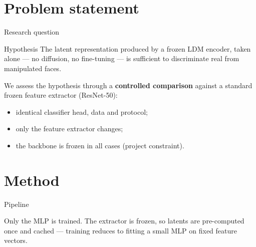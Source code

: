 \documentclass[aspectratio=169,11pt]{beamer}
\begin{document}
\section{Problem statement}

\begin{frame}{Research question}
  \begin{block}{Hypothesis}
    The latent representation produced by a \alert{frozen} LDM encoder,
    taken \alert{alone} --- no diffusion, no fine-tuning --- is sufficient
    to discriminate real from manipulated faces.
  \end{block}

  \medskip
  We assess the hypothesis through a \textbf{controlled comparison} against
  a standard frozen feature extractor (ResNet-50):
  \begin{itemize}
    \item identical classifier head, data and protocol;
    \item only the feature extractor changes;
    \item \alert{the backbone is frozen in all cases} (project constraint).
  \end{itemize}
\end{frame}

\section{Method}

\begin{frame}{Pipeline}
  \begin{center}
  \end{center}
  \medskip
  Only the MLP is trained. The extractor is frozen, so latents are
  \alert{pre-computed once} and cached --- training reduces to fitting a small
  MLP on fixed feature vectors.
\end{frame}
\end{document}
